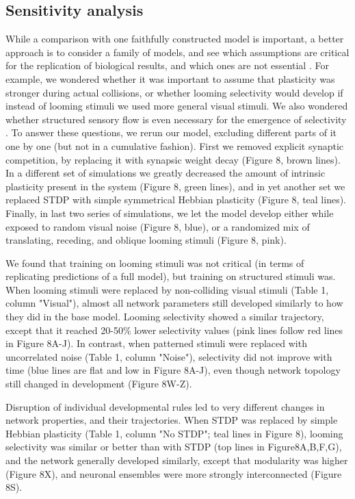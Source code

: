 \documentclass{article}
\begin{document}
\subsection*{Sensitivity analysis}

While a comparison with one faithfully constructed model is important, a better approach is to consider a family of models, and see which assumptions are critical for the replication of biological results, and which ones are not essential \citep{linderman2017constrain, pauli2018repro}. For example, we wondered whether it was important to assume that  plasticity was stronger during actual collisions, or whether looming selectivity would develop if instead of looming stimuli we used more general visual stimuli. We also wondered whether structured sensory flow is even necessary for the emergence of selectivity \citep{triplett2018emergence}. To answer these questions, we rerun our model, excluding different parts of it one by one (but not in a cumulative fashion). First we removed explicit synaptic competition, by replacing it with synapsic weight decay (Figure 8, brown lines). In a different set of simulations we greatly decreased the amount of intrinsic plasticity present in the system (Figure 8, green lines), and in yet another set we replaced STDP with simple symmetrical Hebbian plasticity (Figure 8, teal lines). Finally, in last two series of simulations, we let the model develop either while exposed to random visual noise (Figure 8, blue), or a randomized mix of translating, receding, and oblique looming stimuli (Figure 8, pink).

We found that training on looming stimuli was not critical (in terms of replicating predictions of a full model), but training on structured stimuli was. When looming stimuli were replaced by non-colliding visual stimuli (Table 1, column "Visual"), almost all network parameters still developed similarly to how they did in the base model. Looming selectivity showed a similar trajectory, except that it reached 20-50\% lower selectivity values (pink lines follow red lines in Figure 8A-J). In contrast, when patterned stimuli were replaced with uncorrelated noise (Table 1, column "Noise"), selectivity did not improve with time (blue lines are flat and low in Figure 8A-J), even though network topology still changed in development (Figure 8W-Z).

Disruption of individual developmental rules led to very different changes in network properties, and their trajectories. When STDP was replaced by simple Hebbian plasticity (Table 1, column "No STDP"; teal lines in Figure 8), looming selectivity was similar or better than with STDP (top lines in Figure8A,B,F,G), and the network generally developed similarly, except that modularity was higher (Figure 8X), and neuronal ensembles were more strongly interconnected (Figure 8S). 
\end{document}
